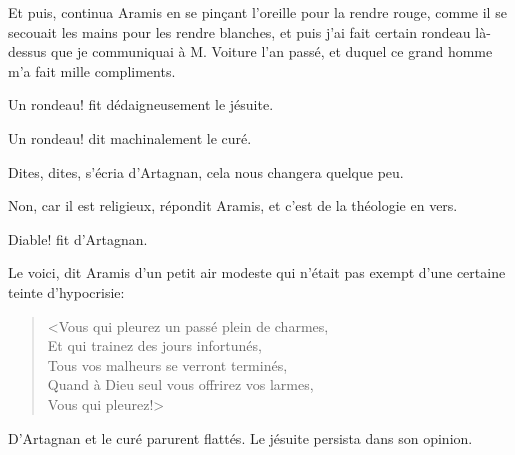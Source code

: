 \speak  Et puis, continua Aramis en se pinçant l'oreille pour la rendre rouge, comme il se secouait les mains pour les rendre blanches, et puis j'ai fait certain rondeau là-dessus que je communiquai à M. Voiture l'an passé, et duquel ce grand homme m'a fait mille compliments. 

\speak  Un rondeau! fit dédaigneusement le jésuite. 

\speak  Un rondeau! dit machinalement le curé. 

\speak  Dites, dites, s'écria d'Artagnan, cela nous changera quelque peu. 

\speak  Non, car il est religieux, répondit Aramis, et c'est de la théologie en vers. 

\speak  Diable! fit d'Artagnan. 

\speak  Le voici, dit Aramis d'un petit air modeste qui n'était pas exempt d'une certaine teinte d'hypocrisie: 

\begin{verse}
<Vous qui pleurez un passé plein de charmes,\\
Et qui trainez des jours infortunés,\\
Tous vos malheurs se verront terminés,\\
Quand à Dieu seul vous offrirez vos larmes,\\
Vous qui pleurez!>
\end{verse}

D'Artagnan et le curé parurent flattés. Le jésuite persista dans son opinion. 

